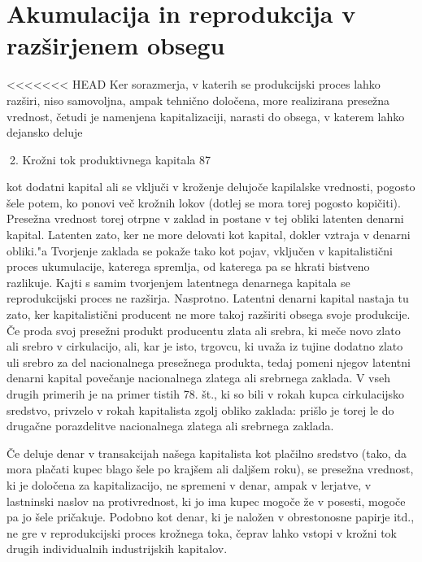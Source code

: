 \documentclass[kapital_02.tex]{subfiles}
\begin{document}
\section{Akumulacija in reprodukcija v razširjenem obsegu}

<<<<<<< HEAD
Ker sorazmerja, v katerih se produkcijski proces lahko razširi, niso samovoljna, ampak tehnično določena, more realizirana presežna vrednost, četudi je namenjena kapitalizaciji, narasti do obsega, v katerem lahko dejansko deluje



2. Krožni tok produktivnega kapitala 87



 kot dodatni kapital ali se vključi v kroženje delujoče kapilalske vrednosti, pogosto šele potem, ko ponovi več krožnih lokov (dotlej se mora torej pogosto kopičiti). Presežna vrednost torej otrpne v zaklad in postane v tej obliki latenten denarni kapital. Latenten zato, ker ne more delovati kot kapital, dokler vztraja v denarni obliki."a Tvorjenje zaklada se pokaže tako kot pojav, vključen v kapitalistični proces ukumulacije, katerega spremlja, od katerega pa se hkrati bistveno razlikuje. Kajti s samim tvorjenjem latentnega denarnega kapitala se reprodukcijski proces ne razširja. Nasprotno. Latentni denarni kapital nastaja tu zato, ker kapitalistični producent ne more takoj razširiti obsega svoje produkcije. Če proda svoj presežni produkt producentu zlata ali srebra, ki meče novo zlato ali srebro v cirkulacijo, ali, kar je isto, trgovcu, ki uvaža iz tujine dodatno zlato uli srebro za del nacionalnega presežnega produkta, tedaj pomeni njegov latentni denarni kapital povečanje nacionalnega zlatega ali srebrnega zaklada. V vseh drugih primerih je na primer tistih 78. št., ki so bili v rokah kupca cirkulacijsko sredstvo, privzelo v rokah kapitalista zgolj obliko zaklada: prišlo je torej le do drugačne porazdelitve nacionalnega zlatega ali srebrnega zaklada.

Če deluje denar v transakcijah našega kapitalista kot plačilno sredstvo (tako, da mora plačati kupec blago šele po krajšem ali daljšem roku), se presežna vrednost, ki je določena za kapitalizacijo, ne spremeni v denar, ampak v lerjatve, v lastninski naslov na protivrednost, ki jo ima kupec mogoče že v posesti, mogoče pa jo šele pričakuje. Podobno kot denar, ki je naložen v obrestonosne papirje itd., ne gre v reprodukcijski proces krožnega toka, čeprav lahko vstopi v krožni tok drugih individualnih industrijskih kapitalov.
\end{document}
